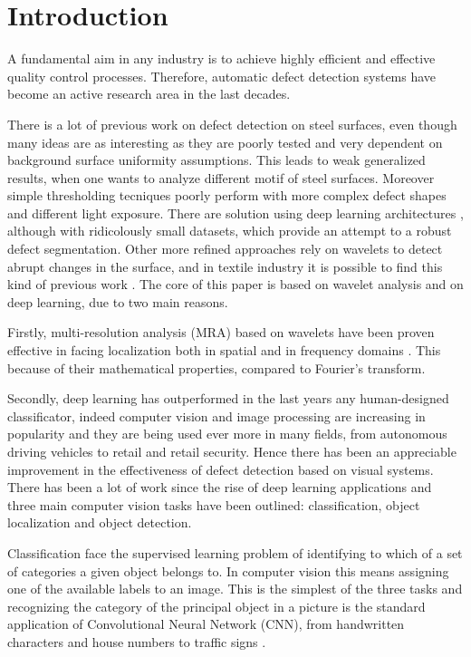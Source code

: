 \section{Introduction}
    \par{
        A fundamental aim in any industry is to achieve highly efficient and effective quality control processes. Therefore, automatic defect detection systems have become an active research area in the last decades. 
    }
    \par{
        There is a lot of previous work on defect detection on steel surfaces, even though many ideas \cite{ieee:4777721, ieee:7030439, ieee:8623728} are as interesting as they are poorly tested and very dependent on background surface uniformity assumptions. This leads to weak generalized results, when one wants to analyze different motif of steel surfaces. Moreover simple thresholding tecniques poorly perform with more complex defect shapes and different light exposure. There are solution using deep learning architectures \cite{ieee:1334512, ieee:6738559}, although with ridicolously small datasets, which provide an attempt to a robust defect segmentation. Other more refined approaches rely on wavelets to detect abrupt changes in the surface, and in textile industry it is possible to find this kind of previous work \cite{ieee:993164, ieee:6703333, ieee:7155940, sciencedirect:NGAN2011442}. The core of this paper is based on wavelet analysis and on deep learning, due to two main reasons.
    }
    \par{
        Firstly, multi-resolution analysis (MRA) based on wavelets have been proven effective in facing localization both in spatial and in frequency domains \cite{Vetterli:1995:WSC:201007, Daubechies:1992:TLW:130655, intechopen:bernardini}. This because of their mathematical properties, compared to Fourier's transform.
    }
    \par{
        Secondly, deep learning has outperformed in the last years any human-designed classificator, indeed computer vision and image processing are increasing in popularity and they are being used ever more in many fields, from autonomous driving vehicles to retail and retail security. Hence there has been an appreciable improvement in the effectiveness of defect detection based on visual systems. There has been a lot of work since the rise of deep learning applications \cite{researchgate:deeplearning} and three main computer vision tasks have been outlined: classification, object localization and object detection.
    }
    \par{
        Classification face the supervised learning problem of identifying to which of a set of categories a given object belongs to. In computer vision this means assigning one of the available labels to an image. This is the simplest of the three tasks and recognizing the category of the principal object in a picture is the standard application of Convolutional Neural Network (CNN), from handwritten characters \cite{nips:NIPS1989_293, ieee:6248110} and house numbers \cite{ieee:6460867} to traffic signs \cite{ieee:6248110}.

    }
